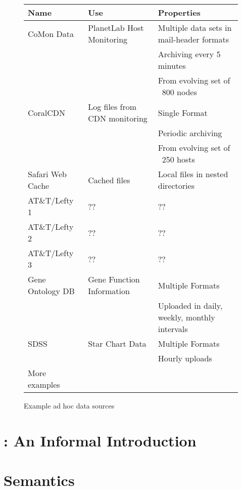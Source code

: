 \documentclass[nocopyrightspace]{sigplanconf}
\begin{document}
\begin{figure*}
\begin{center}
\begin{tabular}{|l|l|l|}
\hline\hline
Name & Use & Properties 
\\\hline\hline
CoMon Data & PlanetLab Host Monitoring & Multiple data sets in mail-header formats\\
                                       && Archiving every 5 minutes \\
                                       && From evolving set of ~800 nodes \\\hline
CoralCDN & Log files from CDN monitoring & Single Format \\
                                       && Periodic archiving \\
                                       && From evolving set of ~250 hosts \\\hline
Safari Web Cache & Cached files        & Local files in nested directories \\\hline
AT\&T/Lefty 1 & ?? & ?? \\\hline
AT\&T/Lefty 2 & ?? & ?? \\\hline
AT\&T/Lefty 3 & ?? & ?? \\\hline
Gene Ontology DB & Gene Function Information & Multiple Formats \\
                                             && Uploaded in daily, weekly, monthly intervals \\\hline
SDSS & Star Chart Data & Multiple Formats \\
                       && Hourly uploads \\\hline
More examples & & \\
\hline\hline
\end{tabular}
\end{center}
\caption{Example ad hoc data sources}
\label{fig:exampledata}
\end{figure*}

\section{\padsd{}: An Informal Introduction}
\label{sec:informal}


\section{\padsd{} Semantics}
\label{sec:semantics}

\end{document}
